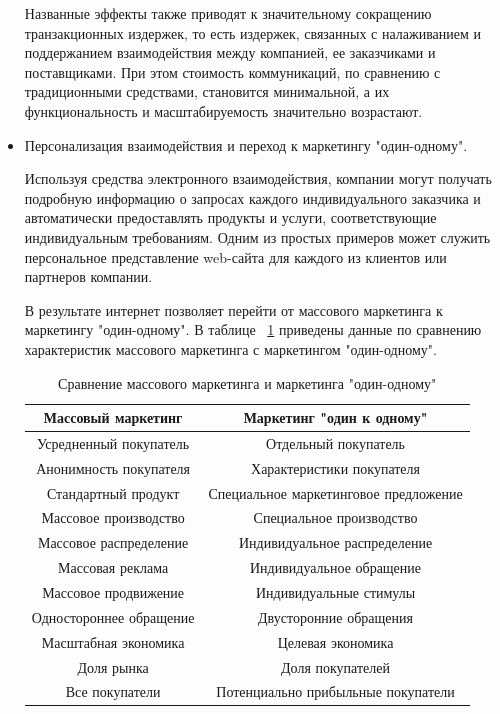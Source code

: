 \documentclass[a4paper,english,russian]{G2-105}
\begin{document}
\begin{itemize}
\par Названные эффекты также приводят к значительному сокращению транзакционных издержек, то есть издержек, связанных с налаживанием и поддержанием взаимодействия между компанией, ее заказчиками и поставщиками. При этом стоимость коммуникаций, по сравнению с традиционными средствами, становится минимальной, а их функциональность и масштабируемость значительно возрастают.
\item Персонализация взаимодействия и переход к маркетингу "один-одному".
\par Используя средства электронного взаимодействия, компании могут получать подробную информацию о запросах каждого индивидуального заказчика и автоматически предоставлять продукты и услуги, соответствующие индивидуальным требованиям. Одним из простых примеров может служить персональное представление web-сайта для каждого из клиентов или партнеров компании.
\par В результате интернет позволяет перейти от массового маркетинга к маркетингу "один-одному". В таблице ~\ref{am} приведены данные по сравнению характеристик массового маркетинга с маркетингом "один-одному".
\begin{longtable}{|c|c|}
    \caption{Сравнение массового маркетинга и маркетинга "один-одному"}\\ \hline
    \label{am} 
    Массовый маркетинг & Маркетинг "один к одному" \\ \hline \endhead
    Усредненный покупатель & Отдельный покупатель \\ \hline
    Анонимность покупателя & Характеристики покупателя \\ \hline
    Стандартный продукт & Специальное маркетинговое предложение \\ \hline
    Массовое производство & Специальное производство \\ \hline
    Массовое распределение & Индивидуальное распределение \\ \hline
    Массовая реклама & Индивидуальное обращение \\ \hline
    Массовое продвижение & Индивидуальные стимулы \\ \hline
    Одностороннее обращение & Двусторонние обращения \\ \hline
    Масштабная экономика & Целевая экономика \\ \hline
    Доля рынка & Доля покупателей \\ \hline
    Все покупатели & Потенциально прибыльные покупатели \\ \hline

\end{longtable}
\end{itemize}
\end{document}
